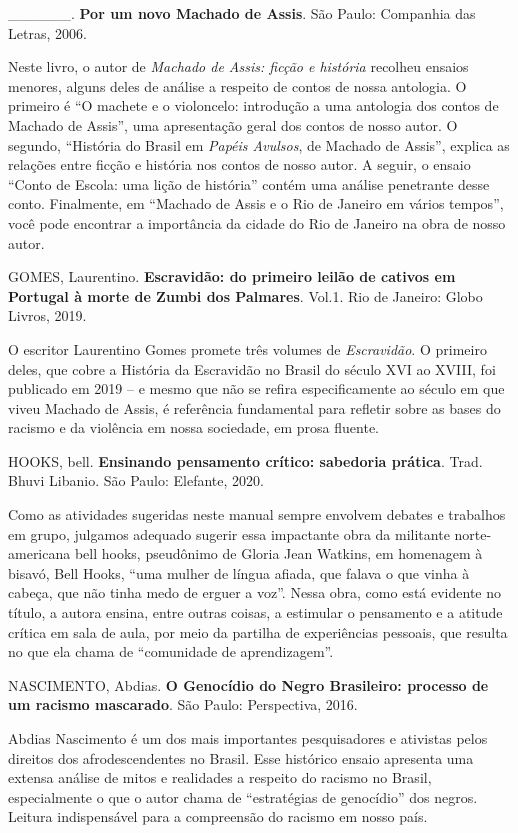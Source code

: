 \documentclass[11pt]{extarticle}
\begin{document}
\_\_\_\_\_\_. \textbf{Por um novo Machado de Assis}. São Paulo:
Companhia das Letras, 2006.

Neste livro, o autor de \emph{Machado de Assis: ficção e história}
recolheu ensaios menores, alguns deles de análise a respeito de contos
de nossa antologia. O primeiro é ``O machete e o violoncelo: introdução
a uma antologia dos contos de Machado de Assis'', uma apresentação geral
dos contos de nosso autor. O segundo, ``História do Brasil em
\emph{Papéis Avulsos}, de Machado de Assis'', explica as relações entre
ficção e história nos contos de nosso autor. A seguir, o ensaio ``Conto
de Escola: uma lição de história'' contém uma análise penetrante desse
conto. Finalmente, em ``Machado de Assis e o Rio de Janeiro em vários
tempos'', você pode encontrar a importância da cidade do Rio de Janeiro
na obra de nosso autor.

GOMES, Laurentino. \textbf{Escravidão: do primeiro leilão de cativos em
Portugal à morte de Zumbi dos Palmares}. Vol.1. Rio de Janeiro: Globo
Livros, 2019.

O escritor Laurentino Gomes promete três volumes de \emph{Escravidão}. O
primeiro deles, que cobre a História da Escravidão no Brasil do século
XVI ao XVIII, foi publicado em 2019 -- e mesmo que não se refira
especificamente ao século em que viveu Machado de Assis, é referência
fundamental para refletir sobre as bases do racismo e da violência em
nossa sociedade, em prosa fluente.

HOOKS, bell. \textbf{Ensinando pensamento crítico: sabedoria prática}.
Trad. Bhuvi Libanio. São Paulo: Elefante, 2020.

Como as atividades sugeridas neste manual sempre envolvem debates e
trabalhos em grupo, julgamos adequado sugerir essa impactante obra da
militante norte-americana bell hooks, pseudônimo de Gloria Jean Watkins,
em homenagem à bisavó, Bell Hooks, ``uma mulher de língua afiada, que
falava o que vinha à cabeça, que não tinha medo de erguer a voz''. Nessa
obra, como está evidente no título, a autora ensina, entre outras
coisas, a estimular o pensamento e a atitude crítica em sala de aula,
por meio da partilha de experiências pessoais, que resulta no que ela
chama de ``comunidade de aprendizagem''.

NASCIMENTO, Abdias. \textbf{O Genocídio do Negro Brasileiro: processo de
um racismo mascarado}. São Paulo: Perspectiva, 2016.

Abdias Nascimento é um dos mais importantes pesquisadores e ativistas
pelos direitos dos afrodescendentes no Brasil. Esse histórico ensaio
apresenta uma extensa análise de mitos e realidades a respeito do
racismo no Brasil, especialmente o que o autor chama de ``estratégias de
genocídio'' dos negros. Leitura indispensável para a compreensão do
racismo em nosso país.
\end{document}
